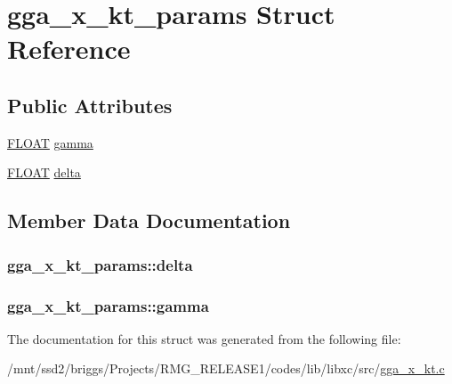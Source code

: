\hypertarget{structgga__x__kt__params}{\section{gga\-\_\-x\-\_\-kt\-\_\-params Struct Reference}
\label{structgga__x__kt__params}
}
\subsection*{Public Attributes}
\begin{DoxyCompactItemize}
\item 
\hyperlink{src_2xc__config_8h_ae8690abbffa85934d64d545920e2b108}{F\-L\-O\-A\-T} \hyperlink{structgga__x__kt__params_afc66cba43c18d64da461c1172fb8266f}{gamma}
\item 
\hyperlink{src_2xc__config_8h_ae8690abbffa85934d64d545920e2b108}{F\-L\-O\-A\-T} \hyperlink{structgga__x__kt__params_a72d4b65fa2c046598f3dd709b3abc1f8}{delta}
\end{DoxyCompactItemize}


\subsection{Member Data Documentation}
\hypertarget{structgga__x__kt__params_a72d4b65fa2c046598f3dd709b3abc1f8}{
\subsubsection[{delta}]{ gga\-\_\-x\-\_\-kt\-\_\-params\-::delta}}\label{structgga__x__kt__params_a72d4b65fa2c046598f3dd709b3abc1f8}
\hypertarget{structgga__x__kt__params_afc66cba43c18d64da461c1172fb8266f}{
\subsubsection[{gamma}]{ gga\-\_\-x\-\_\-kt\-\_\-params\-::gamma}}\label{structgga__x__kt__params_afc66cba43c18d64da461c1172fb8266f}


The documentation for this struct was generated from the following file\-:\begin{DoxyCompactItemize}
\item 
/mnt/ssd2/briggs/\-Projects/\-R\-M\-G\-\_\-\-R\-E\-L\-E\-A\-S\-E1/codes/lib/libxc/src/\hyperlink{gga__x__kt_8c}{gga\-\_\-x\-\_\-kt.\-c}\end{DoxyCompactItemize}
